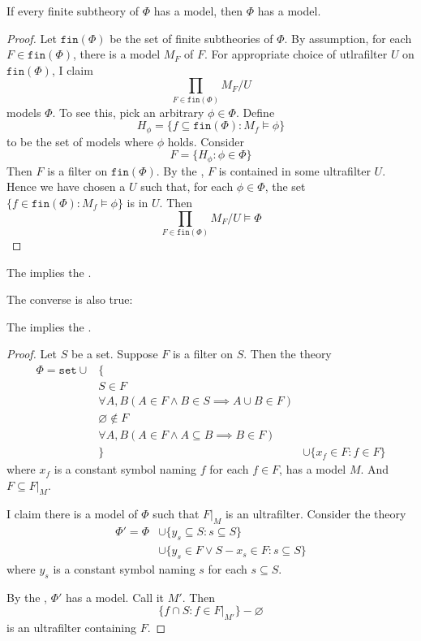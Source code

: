 \documentclass{scrartcl}
\begin{document}
\begin{theorem}\label{th:compactness}
  If every finite subtheory of $\Phi$ has a model, then $\Phi$ has a model. 
\end{theorem}
\begin{proof}
  \newcommand{\finof}{\texttt{fin}}
  Let $\finof(\Phi)$ be the set of finite subtheories of $\Phi$. By assumption, for each $F\in\finof(\Phi)$, there is a model $M_F$ of $F$. 
For appropriate choice of utlrafilter $U$ on $\finof(\Phi)$, I claim
\[
\prod_{F\in\finof(\Phi)} M_F/U
\]
models $\Phi$. To see this, pick an arbitrary $\phi \in \Phi$. Define
\[
H_\phi = \{f\subseteq \finof(\Phi): M_f \models \phi\} 
\]
to be the set of models where $\phi$ holds.
Consider
\[
F = \{ H_\phi : \phi \in \Phi\}
\]
Then $F$ is a filter on $\finof(\Phi)$. By the , $F$ is contained in some ultrafilter $U$. Hence
we have chosen a $U$ such that, for each $\phi \in \Phi$, the set $\{f\in \finof(\Phi): M_f\models \phi\}$ is in $U$. Then
\[
\prod_{F\in\finof(\Phi)} M_F/U \models \Phi
\]
\end{proof}
\begin{cor}
  The  implies the . 
\end{cor}
The converse is also true: 
\begin{theorem}
  The  implies the . 
\end{theorem}
\begin{proof}
  \newcommand{\setth}{\texttt{set}}
  Let $S$ be a set. Suppose $F$ is a filter on $S$. Then the theory
  \begin{align*}
    \Phi = \setth \cup &\bigl\{ \\
                          &S\in F \\
                          &\forall A,B (A\in F \wedge B \in S \implies A \cup B \in F ) \\
                          &\varnothing \notin F \\
                          &\forall A,B (A\in F \wedge A \subseteq B \implies B \in F ) \\
                     &\bigr\}
                          &\cup \{x_f\in F: f\in F\}
  \end{align*}
  where $x_f$ is a constant symbol naming $f$ for each $f\in F$,
  has a model $M$. And $F\subseteq F|_M$. 
  
  I claim there is a model of $\Phi$ such that $F|_M$ is an ultrafilter.  Consider the theory
  \begin{align*}
    \Phi' = \Phi &\cup \{y_s \subseteq S: s\subseteq S\}\\
                 &\cup \{y_s\in F \vee S-x_s \in F : s \subseteq S\}
  \end{align*}
  where $y_s$ is a constant symbol naming $s$ for each $s\subseteq S$. 
  
  By the , $\Phi'$ has a model. Call it $M'$.  Then
  \[
  \{f\cap S:f\in F|_{M'}\} -\varnothing
  \]
  is an ultrafilter containing $F$. 
\end{proof}
\end{document}
